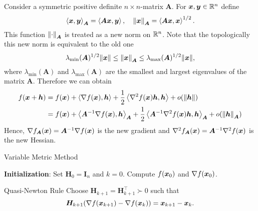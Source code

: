 Consider a symmetric positive definite \(n \times n\)-matrix \(\bm{A}\). For \(\bm{x}, \bm{y} \in \mathbb{R}^n\) define 
\[
    \left\langle \bm{x}, \bm{y} \right\rangle_{\bm{A}} = \left\langle \bm{Ax}, \bm{y} \right\rangle, \quad \norm{\bm{x}}_{\bm{A}} = \left\langle \bm{Ax}, \bm{x} \right\rangle^{1/2}.  
\]
This function \(\norm{\cdot}_{\bm{A}}\) is treated as a new norm on \(\mathbb{R}^n\). Note that the topologically this new norm is equivalent to the 
old one
\[
    \lambda_{\min} (\bm{A})^{1/2}\norm{\bm{x}} \le \norm{\bm{x}}_{\bm{A}} \le  \lambda_{\max} (\bm{A})^{1/2}\norm{\bm{x}},
\]
where \(\lambda_{\min}(\bm{A})\) and \(\lambda_{\max}(\bm{A})\) are the smallest and largest eigenvalues of the matrix \(\bm{A}\). Therefore we can obtain
\[
    \begin{aligned}
        f(\xB + \hB) &= f(\xB) + \innerprod{\grad f(\xB)}{\hB} + \frac{1}{2} \innerprod{\hess f(\xB) \hB}{\hB} + o(\norm{\hB}) \\
        &= f(\xB) + \innerprod{\bm{A}^{-1}\grad f(\xB)}{\hB}_{\bm{A}} + \frac{1}{2} \innerprod{\bm{A}^{-1} \hess f(\xB) \hB}{\hB}_{\bm{A}} + o(\norm{\hB}_{\bm{A}})
    \end{aligned}  
\]
Hence, \(\nabla f_{\bm{A}}(\bm{x}) = \bm{A}^{-1} \nabla f(\bm{x})\) is the new gradient and \(\hess f_{\bm{A}}(\xB) = \bm{A}^{-1} \hess f(\xB)\) is the new Hessian.
\begin{algorithm}[!htbp]
    \caption{Variable Metric Method}\label{alg:variable-metric}
    \textbf{Initialization}: Set \(\bm{H}_0 = \bm{I}_n\) and \(k = 0\). Compute \(f(\bm{x}_0)\) and \(\nabla f(\bm{x}_0)\). \\
\end{algorithm}

\begin{boxnote}{Quasi-Newton Rule}
    Choose \(\bm{H}_{k+1} = \bm{H}_{k+1}^\top \succ 0\) such that
    \[
        \bm{H}_{k+1}(\nabla f(\bm{x}_{k+1}) - \nabla f(\bm{x}_k)) = \bm{x}_{k+1} - \bm{x}_k.
    \] 
\end{boxnote}

